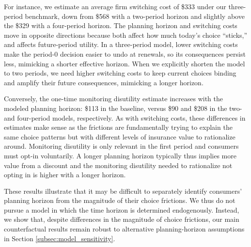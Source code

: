 For instance, we estimate an average firm switching cost of \$333 under our three-period benchmark, down from \$568 with a two-period horizon and slightly above the \$329 with a four-period horizon.
The planning horizon and switching costs move in opposite directions because both affect how much today's choice ``sticks,'' and affects future-period utility.
In a three-period model, lower switching costs make the period-0 decision easier to undo at renewals, so its consequences persist less, mimicking a shorter effective horizon. When we explicitly shorten the model to two periods, we need higher switching costs to keep current choices binding and amplify their future consequences, mimicking a longer horizon.

Conversely, the one-time monitoring disutility estimate increases with the modeled planning horizon: \$113 in the baseline, versus \$90 and \$208 in the two- and four-period models, respectively.
As with switching costs, these differences in estimates make sense as the frictions are fundamentally trying to explain the same choice patterns but with different levels of insurance value to rationalize around.
Monitoring disutility is only relevant in the first period and consumers must opt-in voluntarily. A longer planning horizon typically thus implies more value from a discount and the monitoring disutility needed to rationalize not opting in is higher with a longer horizon.

These results illustrate that it may be difficult to separately identify consumers' planning horizon from the magnitude of their choice frictions. We thus do not pursue a model in which the time horizon is determined endogenously. Instead, we show that, despite differences in the magnitude of choice frictions, our main counterfactual results remain robust to alternative planning-horizon assumptions in Section \ref{subsec:model_sensitivity}.
